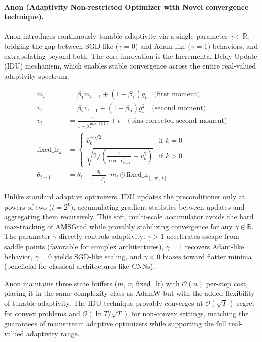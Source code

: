 \paragraph{Anon (Adaptivity Non-restricted Optimizer with Novel convergence technique).}
Anon \citep{anon2026anon} introduces continuously tunable adaptivity via a single parameter $\gamma \in \mathbb{R}$, bridging the gap between SGD-like ($\gamma=0$) and Adam-like ($\gamma=1$) behaviors, and extrapolating beyond both. The core innovation is the Incremental Delay Update (IDU) mechanism, which enables stable convergence across the entire real-valued adaptivity spectrum:

\begin{align}
m_t &= \beta_1 m_{t-1} + (1-\beta_1) g_t \quad\text{(first moment)}\\
v_t &= \beta_2 v_{t-1} + (1-\beta_2) g_t^2 \quad\text{(second moment)}\\
\bar{v}_t &= \frac{v_t}{1-\beta_2^{\max(t,1)}} + \epsilon \quad\text{(bias-corrected second moment)}\\
\text{fixed\_lr}_k &= \begin{cases}
\bar{v}_k^{-\gamma/2} & \text{if } k = 0 \\
\sqrt{2 / \left(\frac{1}{\text{fixed\_lr}_{k-1}^2} + \bar{v}_k^\gamma\right)} & \text{if } k > 0
\end{cases}\\
\theta_{t+1} &= \theta_t - \frac{\eta}{1-\beta_1^t} \cdot m_t \odot \text{fixed\_lr}_{\lfloor\log_2 t\rfloor}
\end{align}

Unlike standard adaptive optimizers, IDU updates the preconditioner only at powers of two ($t = 2^k$), accumulating gradient statistics between updates and aggregating them recursively. This soft, multi-scale accumulator avoids the hard max-tracking of AMSGrad while provably stabilizing convergence for any $\gamma \in \mathbb{R}$. The parameter $\gamma$ directly controls adaptivity: $\gamma > 1$ accelerates escape from saddle points (favorable for complex architectures), $\gamma = 1$ recovers Adam-like behavior, $\gamma = 0$ yields SGD-like scaling, and $\gamma < 0$ biases toward flatter minima (beneficial for classical architectures like CNNs).

Anon maintains three state buffers ($m$, $v$, fixed\_lr) with $\mathcal{O}(n)$ per-step cost, placing it in the same complexity class as AdamW but with the added flexibility of tunable adaptivity. The IDU technique provably converges at $\mathcal{O}(\sqrt{T})$ regret for convex problems and $\mathcal{O}(\ln T / \sqrt{T})$ for non-convex settings, matching the guarantees of mainstream adaptive optimizers while supporting the full real-valued adaptivity range.

